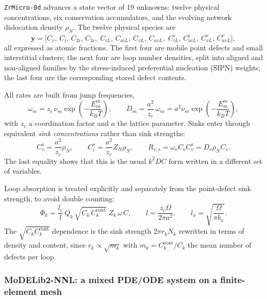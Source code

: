 \documentclass{article}
\newcommand{\MoD}{\textsf{MoDELib2-NNL}}
\newcommand{\ZrOd}{\texttt{ZrMicro-0d}}
\begin{document}
\ZrOd{} advances a state vector of 19 unknowns: twelve physical concentrations,
six conservation accumulators, and the evolving network dislocation density
$\rho_N$. The twelve physical species are
\begin{equation}
\mathbf{y} = \bigl[C_v,\,C_i,\,C_{2i},\,C_{3i},\;
C_{iL},\,C_{aiL},\,C_{vL},\,C_{avL},\;
C_{iL}^{i},\,C_{aiL}^{i},\,C_{vL}^{v},\,C_{avL}^{v}\bigr],
\label{eq:zrmicro_state}
\end{equation}
all expressed as atomic fractions. The first four are mobile point defects and
small interstitial clusters; the next four are loop number densities, split into
aligned and non-aligned families by the stress-induced preferential nucleation
(SIPN) weights; the last four are the corresponding stored defect contents.

All rates are built from jump frequencies,
\begin{equation}
\omega_m = z_c\,\nu_m \exp\!\left(-\frac{E^m_m}{k_BT}\right),
\qquad
D_m = \frac{a^2}{z_c}\,\omega_m = a^2 \nu_m \exp\!\left(-\frac{E^m_m}{k_BT}\right),
\label{eq:omega}
\end{equation}
with $z_c$ a coordination factor and $a$ the lattice parameter. Sinks enter
through equivalent \emph{sink concentrations} rather than sink strengths:
\begin{equation}
C_v^s = \frac{a^2}{z_c}\rho_N ,
\qquad
C_i^s = \frac{a^2}{z_c} Z_N \rho_N ,
\qquad
R_{v,s} = \omega_v C_v C_v^s = D_v \rho_N C_v .
\label{eq:sinkconc}
\end{equation}
The last equality shows that this is the usual $k^2 D C$ form written in a
different set of variables.

Loop absorption is treated explicitly and separately from the point-defect sink
strength, to avoid double counting:
\begin{equation}
\Phi_{k} = \frac{l_c}{l}\,Q_k\,
\sqrt{C_k\,C_k^{\text{cont}}}\;Z_k\,\omega\,C ,
\qquad
l = \frac{z_c \Omega}{2\pi a^2},
\qquad
l_x = \sqrt{\frac{\Omega}{\pi b_x}} .
\label{eq:loopabs}
\end{equation}
The $\sqrt{C_k C_k^{\text{cont}}}$ dependence is the sink strength $2\pi r_k N_k$
rewritten in terms of density and content, since $r_k \propto \sqrt{m_k}$ with
$m_k = C_k^{\text{cont}}/C_k$ the mean number of defects per loop.

\subsubsection{\MoD{}: a mixed PDE/ODE system on a finite-element mesh}
\end{document}
